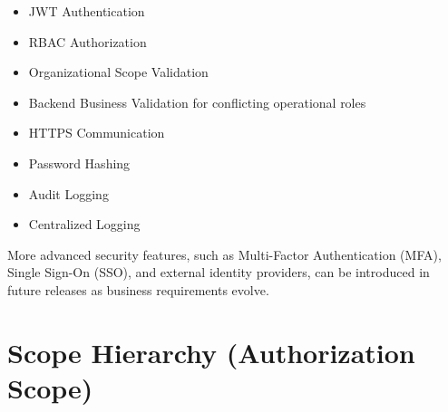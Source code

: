 \documentclass[11pt]{article}
\begin{document}
\begin{itemize}
    \item JWT Authentication
    \item RBAC Authorization
    \item Organizational Scope Validation
    \item Backend Business Validation for conflicting operational roles
    \item HTTPS Communication
    \item Password Hashing
    \item Audit Logging
    \item Centralized Logging
\end{itemize}

More advanced security features, such as Multi-Factor Authentication (MFA),
Single Sign-On (SSO), and external identity providers, can be introduced in
future releases as business requirements evolve.

\clearpage
\section{Scope Hierarchy (Authorization Scope)}
\end{document}
